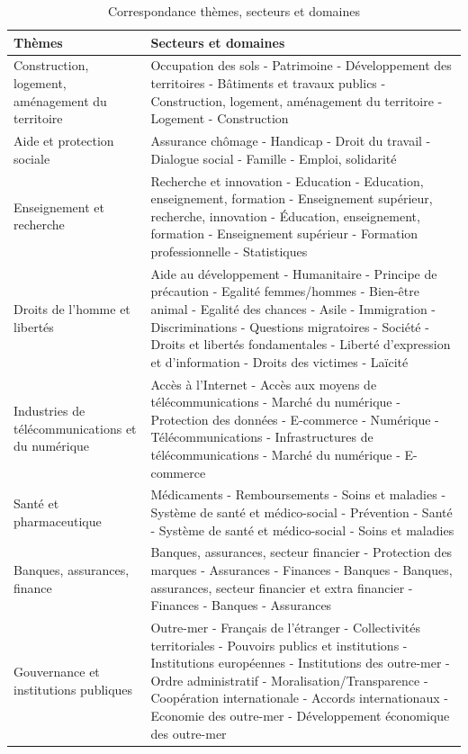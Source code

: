 \documentclass[a4paper,12pt]{article}
\begin{document}
\begin{table}[h]
\footnotesize
\centering
\label{tab:secteurs}
\caption{Correspondance thèmes, secteurs et domaines}
\begin{tabularx}{\textwidth}{|>{\RaggedRight}X|>{\RaggedRight}p{12cm}|}
\hline
\textbf{Thèmes} & \textbf{Secteurs et domaines} \\
\hline
Construction, logement, aménagement du territoire & Occupation des sols - Patrimoine - Développement des territoires - Bâtiments et travaux publics - Construction, logement, aménagement du territoire - Logement - Construction \\
\hline
Aide et protection sociale & Assurance chômage - Handicap - Droit du travail - Dialogue social - Famille - Emploi, solidarité \\
\hline
Enseignement et recherche & Recherche et innovation - Education - Education, enseignement, formation - Enseignement supérieur, recherche, innovation - Éducation, enseignement, formation - Enseignement supérieur - Formation professionnelle - Statistiques \\
\hline
Droits de l'homme et libertés & Aide au développement - Humanitaire - Principe de précaution - Egalité femmes/hommes - Bien-être animal - Egalité des chances - Asile - Immigration - Discriminations - Questions migratoires - Société - Droits et libertés fondamentales - Liberté d’expression et d’information - Droits des victimes - Laïcité \\
\hline
Industries de télécommunications et du numérique & Accès à l’Internet - Accès aux moyens de télécommunications - Marché du numérique - Protection des données - E-commerce - Numérique - Télécommunications - Infrastructures de télécommunications - Marché du numérique - E-commerce \\
\hline
Santé et pharmaceutique & Médicaments - Remboursements - Soins et maladies - Système de santé et médico-social - Prévention - Santé - Système de santé et médico-social - Soins et maladies \\
\hline
Banques, assurances, finance & Banques, assurances, secteur financier - Protection des marques - Assurances - Finances - Banques - Banques, assurances, secteur financier et extra financier - Finances - Banques - Assurances \\
\hline
Gouvernance et institutions publiques & Outre-mer - Français de l’étranger - Collectivités territoriales - Pouvoirs publics et institutions - Institutions européennes - Institutions des outre-mer - Ordre administratif - Moralisation/Transparence - Coopération internationale - Accords internationaux - Economie des outre-mer - Développement économique des outre-mer \\

\end{tabularx}
\end{table}
\end{document}
